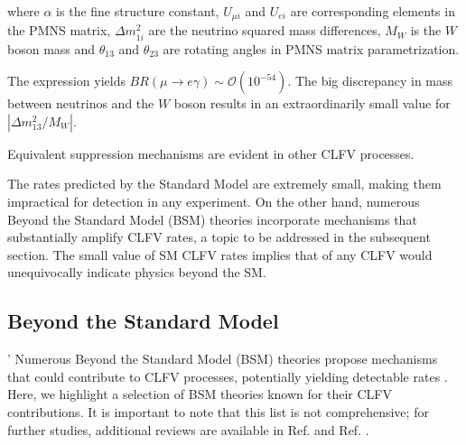 where $\alpha$ is the fine structure constant, $U_{\mu i}$ and $U_{ei}$ are corresponding elements in the PMNS matrix, $\Delta m_{1i}^2$ are the neutrino squared mass differences, $M_W$ is the $W$ boson mass and $\theta_{13}$ and $\theta_{23}$ are rotating angles in PMNS matrix parametrization.


The expression yields $B R(\mu \rightarrow e \gamma) \sim \mathcal{O}(10^{-54})$. The big discrepancy in mass between neutrinos and the $W$ boson results in an extraordinarily small value for $|\Delta m_{13}^2/M_W|$.


Equivalent suppression mechanisms are evident in other CLFV processes.


The rates predicted by the Standard Model are extremely small, making them impractical for detection in any experiment. On the other hand, numerous Beyond the Standard Model (BSM) theories incorporate mechanisms that substantially amplify CLFV rates, a topic to be addressed in the subsequent section. {\violet The small value} of  SM CLFV rates implies that   of any CLFV   would unequivocally indicate physics beyond the SM.

\subsection{Beyond the Standard Model}'
Numerous Beyond the Standard Model (BSM) theories propose mechanisms that could contribute to CLFV processes, potentially yielding  detectable rates . Here, we highlight a selection of BSM theories known for their CLFV contributions. It is important to note that this list is not comprehensive; for further studies, additional reviews are available in Ref. \cite{clfv_signorelli} and Ref. \cite{universe8060299}.
